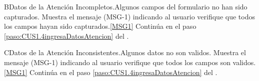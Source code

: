 	\begin{UCtrayectoriaA}{B}{Datos de la Atención Incompletos.}{Algunos campos del formulario no han sido capturados.}
			\UCpaso Muestra el mensaje (MSG-1) indicando al usuario verifique que todos los campos hayan sido capturados.\ref{MSG1}
			\UCpaso Continúa en el paso \ref{paso:CUS1.4ingresaDatosAtencion} del .
	\end{UCtrayectoriaA}

	\begin{UCtrayectoriaA}{C}{Datos de la Atención Inconsistentes.}{Algunos datos no son validos.}
			\UCpaso Muestra el mensaje (MSG-1) indicando al usuario verifique que todos los campos son validos.\ref{MSG1}
			\UCpaso Continúa en el paso \ref{paso:CUS1.4ingresaDatosAtencion} del .
	\end{UCtrayectoriaA}
